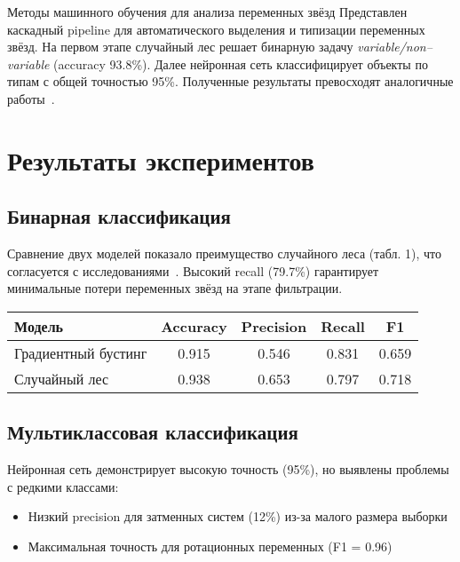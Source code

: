 \documentclass[oneside, a5paper,10pt]{article}
\begin{document}

\makeInf
{Методы машинного обучения для анализа переменных звёзд}
{Представлен каскадный pipeline для автоматического выделения и типизации переменных звёзд. 
На первом этапе случайный лес решает бинарную задачу \textit{variable/non–variable} (accuracy 93.8\%). 
Далее нейронная сеть классифицирует объекты по типам с общей точностью 95\%. Полученные результаты превосходят аналогичные работы~\cite{bibl:DonetskovAD-1}.}
{
\section{Результаты экспериментов}
\subsection{Бинарная классификация}
Сравнение двух моделей показало преимущество случайного леса (табл. 1), что согласуется с исследованиями~\cite{bibl:DonetskovAD-2}. Высокий recall (79.7\%) гарантирует минимальные потери переменных звёзд на этапе фильтрации.

\begin{center}
  \begin{tabular}{ l | c | c | c | c }
    Модель & Accuracy & Precision & Recall & F1 \\
    \hline
    Градиентный бустинг & 0.915 & 0.546 & 0.831 & 0.659 \\
    Случайный лес & 0.938 & 0.653 & 0.797 & 0.718 \\
  \end{tabular}
  \label{table:comparison}
\end{center}

\subsection{Мультиклассовая классификация}
Нейронная сеть демонстрирует высокую точность (95\%), но выявлены проблемы с редкими классами:
\begin{itemize}
  \item Низкий precision для затменных систем (12\%) из-за малого размера выборки
  \item Максимальная точность для ротационных переменных (F1 = 0.96)
\end{itemize}

}
\end{document}
